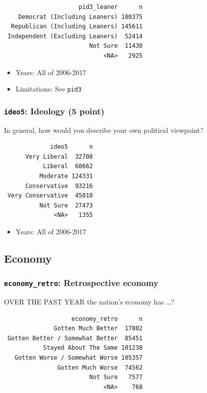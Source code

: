\documentclass[10pt,article,oneside]{memoir}
\theoremstyle{definition}
\begin{document}
\begin{verbatim}
                     pid3_leaner      n
    Democrat (Including Leaners) 180375
  Republican (Including Leaners) 145611
 Independent (Excluding Leaners)  52414
                        Not Sure  11430
                            <NA>   2925
\end{verbatim}

\begin{itemize}
\tightlist
\item
  Years: All of 2006-2017
\item
  Limitations: See \texttt{pid3}
\end{itemize}

\subsubsection{\texorpdfstring{\texttt{ideo5}: Ideology (5
point)}{ideo5: Ideology (5 point)}}\label{ideo5-ideology-5-point}

In general, how would you describe your own political viewpoint?

\begin{verbatim}
             ideo5      n
      Very Liberal  32708
           Liberal  68662
          Moderate 124331
      Conservative  93216
 Very Conservative  45010
          Not Sure  27473
              <NA>   1355
\end{verbatim}

\begin{itemize}
\tightlist
\item
  Years: All of 2006-2017
\end{itemize}

\subsection{Economy}\label{economy}

\subsubsection{\texorpdfstring{\texttt{economy\_retro}: Retrospective
economy}{economy\_retro: Retrospective economy}}\label{economy_retro-retrospective-economy}

OVER THE PAST YEAR the nation's economy has \ldots{}?

\begin{verbatim}
                   economy_retro      n
              Gotten Much Better  17802
 Gotten Better / Somewhat Better  85451
           Stayed About The Same 101238
   Gotten Worse / Somewhat Worse 105357
               Gotten Much Worse  74562
                        Not Sure   7577
                            <NA>    768
\end{verbatim}
\end{document}
